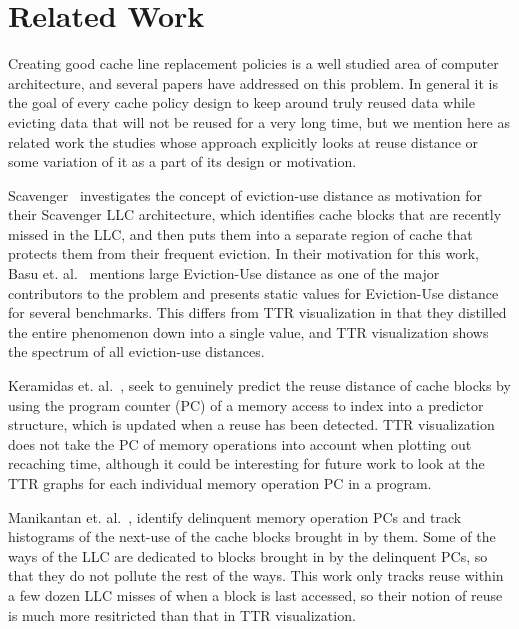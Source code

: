 \section{Related Work}

Creating good cache line replacement policies is a well
studied area of computer architecture, and several papers have
addressed on this problem.  In general it is the goal of every cache
policy design to keep around truly reused data while evicting data
that will not be reused for a very long time, but we mention here as
related work the studies whose approach explicitly looks at reuse distance or some
variation of it as a part of its design or motivation.

Scavenger~\cite{basukirman07} investigates the concept of eviction-use distance
as motivation for their Scavenger LLC architecture, which identifies
cache blocks that are recently missed in the LLC, and then puts them
into a separate region of cache that protects them from their frequent
eviction.  In their motivation for this work, Basu et. al.~\cite{basukirman07}
mentions large Eviction-Use distance as one of the major contributors
to the problem and presents static values for Eviction-Use distance
for several benchmarks.  This differs from TTR visualization in that
they distilled the entire phenomenon down into a single value, and
TTR visualization shows the spectrum of all eviction-use distances.

Keramidas et. al.~\cite{keramidaspetoumenos07}, seek to genuinely predict the reuse
distance of cache blocks by using the program counter (PC) of a memory
access to index into a predictor structure, which is updated when a
reuse has been detected.  TTR visualization does not take the PC of
memory operations into account when plotting out recaching time,
although it could be interesting for future work to look at the TTR
graphs for each individual memory operation PC in a program.

Manikantan et. al.~\cite{manikantanrajan10,manikantanrajan11}, identify delinquent memory operation PCs and track
histograms of the next-use of the cache blocks brought in by them.
Some of the ways of the LLC are dedicated to blocks brought in by the
delinquent PCs, so that they do not pollute the rest of the ways.
This work only tracks reuse within a few dozen LLC misses of when a
block is last accessed, so their notion of reuse is much more
resitricted than that in TTR visualization.

